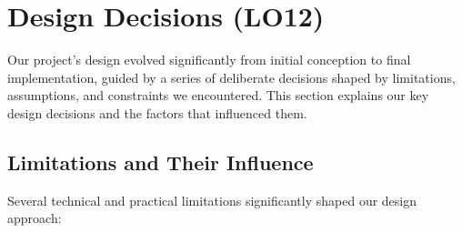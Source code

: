\documentclass{article}
\begin{document}
\section{Design Decisions (LO12)}

Our project's design evolved significantly from initial conception to final implementation, guided by a series of deliberate decisions shaped by limitations, assumptions, and constraints we encountered. This section explains our key design decisions and the factors that influenced them.

\subsection{Limitations and Their Influence}

Several technical and practical limitations significantly shaped our design approach:
\end{document}
